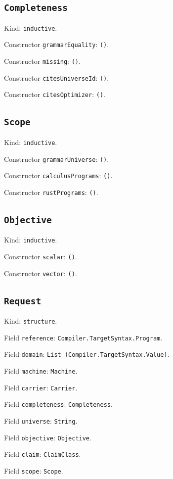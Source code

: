 \documentclass[11pt]{article}
\begin{document}
\subsection*{\texttt{Completeness}}
\noindent Kind: \texttt{inductive}.\par
\noindent Constructor \texttt{grammarEquality}: \texttt{()}.\par
\noindent Constructor \texttt{missing}: \texttt{()}.\par
\noindent Constructor \texttt{citesUniverseId}: \texttt{()}.\par
\noindent Constructor \texttt{citesOptimizer}: \texttt{()}.\par
\subsection*{\texttt{Scope}}
\noindent Kind: \texttt{inductive}.\par
\noindent Constructor \texttt{grammarUniverse}: \texttt{()}.\par
\noindent Constructor \texttt{calculusPrograms}: \texttt{()}.\par
\noindent Constructor \texttt{rustPrograms}: \texttt{()}.\par
\subsection*{\texttt{Objective}}
\noindent Kind: \texttt{inductive}.\par
\noindent Constructor \texttt{scalar}: \texttt{()}.\par
\noindent Constructor \texttt{vector}: \texttt{()}.\par
\subsection*{\texttt{Request}}
\noindent Kind: \texttt{structure}.\par
\noindent Field \texttt{reference}: \texttt{Compiler.TargetSyntax.Program}.\par
\noindent Field \texttt{domain}: \texttt{List (Compiler.TargetSyntax.Value)}.\par
\noindent Field \texttt{machine}: \texttt{Machine}.\par
\noindent Field \texttt{carrier}: \texttt{Carrier}.\par
\noindent Field \texttt{completeness}: \texttt{Completeness}.\par
\noindent Field \texttt{universe}: \texttt{String}.\par
\noindent Field \texttt{objective}: \texttt{Objective}.\par
\noindent Field \texttt{claim}: \texttt{ClaimClass}.\par
\noindent Field \texttt{scope}: \texttt{Scope}.\par
\end{document}

